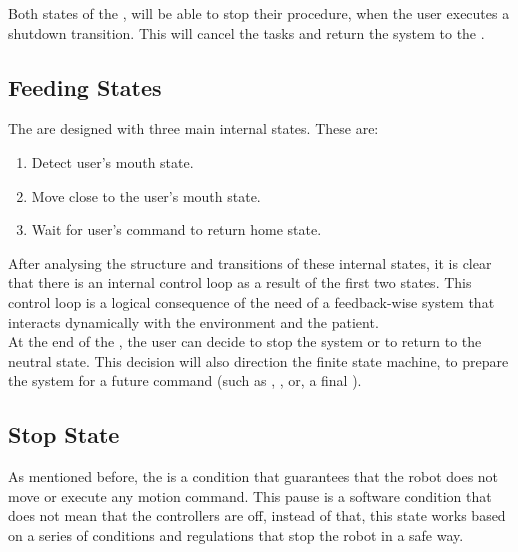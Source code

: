 \documentclass[11pt]{report} %
\begin{document}
Both states of the , will be able to stop their procedure, when the user executes a shutdown transition. This will cancel the tasks and return the system to the .\\


\subsection{Feeding States}

The  are designed with three main internal states. These are:\\

\begin{enumerate}
    \item Detect user's mouth state.
    \item Move close to the user's mouth state.
    \item Wait for user's command to return home state.
\end{enumerate}

After analysing the structure and transitions of these internal states, it is clear that there is an internal control loop as a result of the first two states. This control loop is a logical consequence of the need of a feedback-wise system that interacts dynamically with the environment and the patient.\\

At the end of the , the user can decide to stop the system or to return to the neutral state. This decision will also direction the finite state machine, to prepare the system for a future command (such as , , or, a final ).\\

\subsection{Stop State}

As mentioned before, the  is a condition that guarantees that the robot does not move or execute any motion command. This pause is a software condition that does not mean that the controllers are off, instead of that, this state works based on a series of conditions and regulations that stop the robot in a safe way.\\


\end{document}
